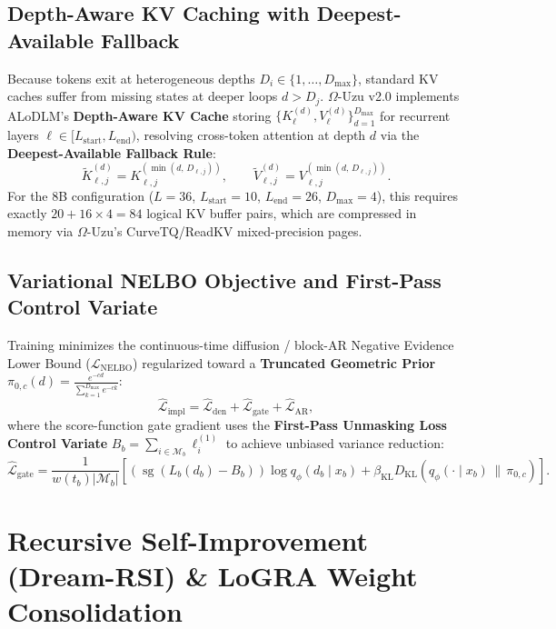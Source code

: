 \documentclass[10pt,a4paper]{article}
\begin{document}
\subsection{Depth-Aware KV Caching with Deepest-Available Fallback}
Because tokens exit at heterogeneous depths $D_i \in \{1, \dots, D_{\max}\}$, standard KV caches suffer from missing states at deeper loops $d > D_j$. $\Omega$-Uzu v2.0 implements ALoDLM's \textbf{Depth-Aware KV Cache} storing $\{K_\ell^{(d)}, V_\ell^{(d)}\}_{d=1}^{D_{\max}}$ for recurrent layers $\ell \in [L_{\mathrm{start}}, L_{\mathrm{end}})$, resolving cross-token attention at depth $d$ via the \textbf{Deepest-Available Fallback Rule}:
\begin{equation}
  \widetilde{K}_{\ell, j}^{(d)} = K_{\ell, j}^{(\min(d,\, D_{\ell, j}))}, \qquad \widetilde{V}_{\ell, j}^{(d)} = V_{\ell, j}^{(\min(d,\, D_{\ell, j}))}.
\end{equation}
For the 8B configuration ($L=36$, $L_{\mathrm{start}}=10$, $L_{\mathrm{end}}=26$, $D_{\max}=4$), this requires exactly $20 + 16 \times 4 = 84$ logical KV buffer pairs, which are compressed in memory via $\Omega$-Uzu's CurveTQ/ReadKV mixed-precision pages.

\subsection{Variational NELBO Objective and First-Pass Control Variate}
Training minimizes the continuous-time diffusion / block-AR Negative Evidence Lower Bound ($\mathcal{L}_{\mathrm{NELBO}}$) regularized toward a \textbf{Truncated Geometric Prior} $\pi_{0,c}(d) = \frac{e^{-cd}}{\sum_{k=1}^{D_{\max}} e^{-ck}}$:
\begin{equation}
  \widehat{\mathcal{L}}_{\mathrm{impl}} = \widehat{\mathcal{L}}_{\mathrm{den}} + \widehat{\mathcal{L}}_{\mathrm{gate}} + \widehat{\mathcal{L}}_{\mathrm{AR}},
\end{equation}
where the score-function gate gradient uses the \textbf{First-Pass Unmasking Loss Control Variate} $B_b = \sum_{i \in \mathcal{M}_b} \ell_i^{(1)}$ to achieve unbiased variance reduction:
\begin{equation}
  \widehat{\mathcal{L}}_{\mathrm{gate}} = \frac{1}{w(t_b)|\mathcal{M}_b|} \left[ \left(\operatorname{sg}(L_b(d_b) - B_b)\right) \log q_\phi(d_b \mid x_b) + \beta_{\mathrm{KL}} D_{\mathrm{KL}}\!\left(q_\phi(\cdot \mid x_b)\,\|\,\pi_{0,c}\right) \right].
\end{equation}

\section{Recursive Self-Improvement (Dream-RSI) \& LoGRA Weight Consolidation}
\end{document}
